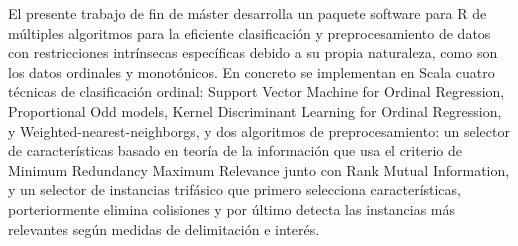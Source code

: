 
El presente trabajo de fin de máster desarrolla un paquete software para R de múltiples algoritmos para la eficiente clasificación y preprocesamiento de datos con restricciones intrínsecas específicas debido a su propia naturaleza, como son los datos ordinales y monotónicos. \newline
En concreto se implementan en Scala cuatro técnicas de clasificación ordinal: Support Vector Machine for Ordinal Regression, Proportional Odd models, Kernel Discriminant Learning for Ordinal Regression, y Weighted-nearest-neighborgs, y dos algoritmos de preprocesamiento: un selector de características basado en teoría de la información que usa el criterio de Minimum Redundancy Maximum Relevance  junto con Rank Mutual Information, y un selector de instancias trifásico que primero selecciona características, porteriormente elimina colisiones y por último detecta las instancias más relevantes según medidas de delimitación e interés.
\newline \newline
{}
\newline {}